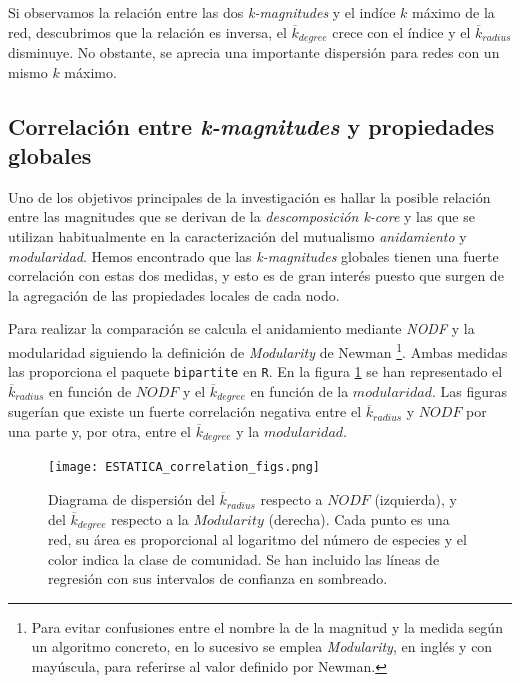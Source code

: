 Si observamos la relación entre las dos \textit{k-magnitudes} y el indíce $k$ máximo de la red, descubrimos que la relación es inversa, el $\overline{k}_{degree}$ crece con el índice y el $\overline{k}_{radius}$ disminuye. No obstante, se aprecia una importante dispersión para redes con un mismo $k$ máximo.


\subsection{Correlación entre \textit{k-magnitudes} y propiedades globales}

Uno de los objetivos principales de la investigación es hallar la posible relación entre las magnitudes que se derivan de la \textit{descomposición k-core} y las que se utilizan habitualmente en la caracterización del mutualismo \textit{anidamiento} y \textit{modularidad}. Hemos encontrado que las \textit{k-magnitudes} globales tienen una fuerte correlación con estas dos medidas, y esto es de gran interés puesto que surgen de la agregación de las propiedades locales de cada nodo.

Para realizar la comparación se calcula el anidamiento mediante \textit{NODF} y la modularidad siguiendo la definición de \textit{Modularity} de Newman \cite{almeida2008consistent, newman2004finding} \footnote{Para evitar confusiones entre el nombre la de la magnitud y la medida según un algoritmo concreto, en lo sucesivo se emplea \textit{Modularity}, en inglés y con mayúscula, para referirse al valor definido por Newman.}. Ambas medidas las proporciona el paquete \texttt{bipartite} en \texttt{R}. En la figura \ref{fig:ESTATICA_corrfigs} se han representado el $\overline {k}_{radius}$ en función de $NODF$ y el $\overline {k}_{degree}$ en función de la $modularidad$. Las figuras sugerían que existe un fuerte correlación negativa entre el $\overline {k}_{radius}$ y $NODF$ por una parte y, por otra, entre el $\overline {k}_{degree}$ y la $modularidad$. 

\begin{figure}[h!]
\centering
\texttt{[image: ESTATICA\_correlation\_figs.png]}
\caption {Diagrama de dispersión del $\overline {k}_{radius}$ respecto a $NODF$ (izquierda), y del $\overline {k}_{degree}$ respecto a la $Modularity$ (derecha). Cada punto es una red, su área es proporcional al logaritmo del número de especies y el color indica la clase de comunidad. Se han incluido las líneas de regresión con sus intervalos de confianza en sombreado.}
\label{fig:ESTATICA_corrfigs}
\end{figure}

